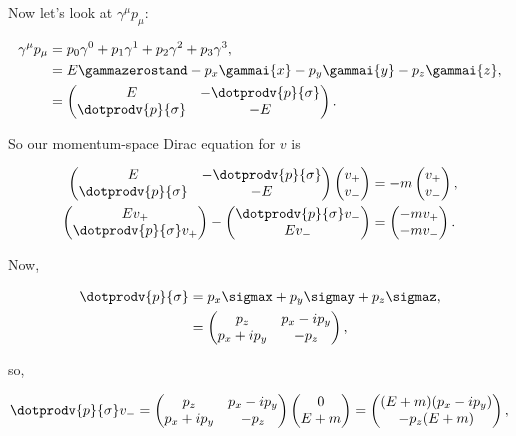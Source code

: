 Now let's look at $\gamma^{\mu}p_{\mu}$:

\begin{align*}
    \gamma^{\mu}p_{\mu} &= p_0 \gamma^0 + p_1\gamma^{1} + p_2\gamma^{2} + p_3\gamma^{3}, \\
    &= E \gammazerostand - p_x \gammai{x} - p_y\gammai{y} - p_z\gammai{z}, \\
    &= \begin{pmatrix}E & -\dotprodv{p}{\sigma} \\ \dotprodv{p}{\sigma} & -E\end{pmatrix}.
\end{align*}

So our momentum-space Dirac equation for $v$ is

\begin{align*}
    \begin{pmatrix}E & -\dotprodv{p}{\sigma} \\ \dotprodv{p}{\sigma} & -E\end{pmatrix}\begin{pmatrix}v_+ \\ v_-\end{pmatrix} &= -m\begin{pmatrix}v_+ \\ v_-\end{pmatrix}, \\
    \begin{pmatrix}Ev_+ \\ \dotprodv{p}{\sigma}v_+\end{pmatrix} - \begin{pmatrix}\dotprodv{p}{\sigma}v_- \\ Ev_-\end{pmatrix} &= \begin{pmatrix}-mv_+ \\ -mv_-\end{pmatrix}.
\end{align*}

Now,

\begin{align*}
    \dotprodv{p}{\sigma} &= p_x\sigmax + p_y\sigmay + p_z\sigmaz, \\
    &= \begin{pmatrix}p_z & p_x - ip_y \\ p_x + ip_y & -p_z\end{pmatrix},
\end{align*}

so,

\begin{equation*}
    \dotprodv{p}{\sigma}v_- = \begin{pmatrix}p_z & p_x - ip_y \\ p_x + ip_y & -p_z\end{pmatrix}\veeminus = \begin{pmatrix}(E+m)(p_x - ip_y) \\ -p_z(E+m)\end{pmatrix},
\end{equation*}

